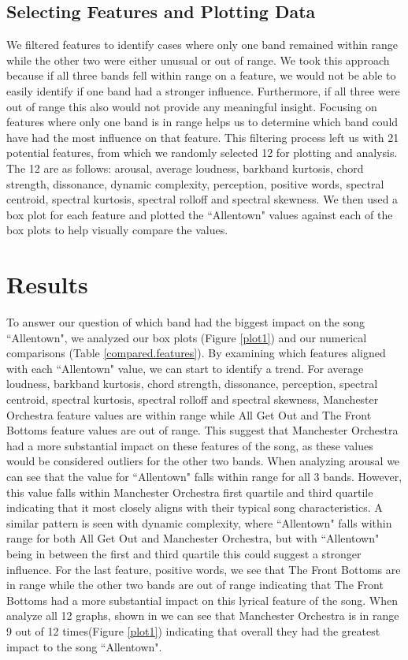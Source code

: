 \documentclass{article}\usepackage[]{graphicx}\usepackage[]{xcolor}
\begin{document}
\begin{multicols}{2}
\subsection{Selecting Features and Plotting Data}
We filtered features to identify cases where only one band remained within range while the other two were either unusual or out of range. We took this approach because if all three bands fell within range on a feature, we would not be able to easily identify if one band had a stronger influence. Furthermore, if all three were out of range this also would not provide any meaningful insight. Focusing on features where only one band is in range helps us to determine which band could have had the most influence on that feature. This filtering process left us with 21 potential features, from which we randomly selected 12 for plotting and analysis. The 12 are as follows: arousal, average loudness, barkband kurtosis, chord strength, dissonance, dynamic complexity, perception, positive words, spectral centroid, spectral kurtosis, spectral rolloff and spectral skewness. We then used a box plot for each feature and plotted the ``Allentown" values against each of the box plots to help visually compare the values. 

\section{Results}
To answer our question of which band had the biggest impact on the song ``Allentown", we analyzed our box plots (Figure \ref{plot1}) and our numerical comparisons (Table \ref{compared.features}). By examining which features aligned with each ``Allentown" value, we can start to identify a trend. For average loudness, barkband kurtosis, chord strength, dissonance, perception, spectral centroid, spectral kurtosis, spectral rolloff and spectral skewness, Manchester Orchestra feature values are within range while All Get Out and The Front Bottoms feature values are out of range. This suggest that Manchester Orchestra had a more substantial impact on these features of the song, as these values would be considered outliers for the other two bands. When analyzing arousal we can see that the value for ``Allentown" falls within range for all 3 bands. However, this value falls within Manchester Orchestra first quartile and third quartile indicating that it most closely aligns with their typical song characteristics. A similar pattern is seen with dynamic complexity, where ``Allentown" falls within range for both All Get Out and Manchester Orchestra, but with ``Allentown" being in between the first and third quartile this could suggest a stronger influence. For the last feature, positive words, we see that The Front Bottoms are in range while the other two bands are out of range indicating that The Front Bottoms had a more substantial impact on this lyrical feature of the song. When analyze all 12 graphs, shown in we can see that Manchester Orchestra is in range 9 out of 12 times(Figure \ref{plot1}) indicating that overall they had the greatest impact to the song ``Allentown".


\end{multicols}
\end{document}
